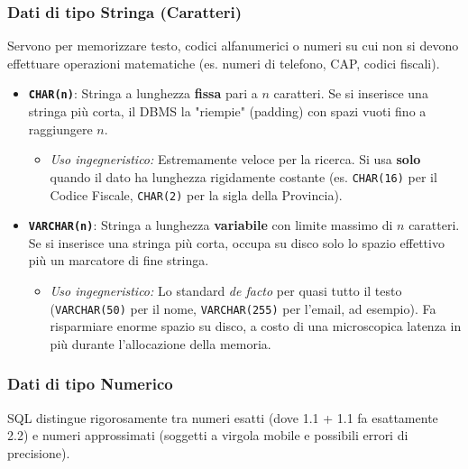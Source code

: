 \subsubsection*{Dati di tipo Stringa (Caratteri)}
Servono per memorizzare testo, codici alfanumerici o numeri su cui non si devono effettuare operazioni matematiche (es. numeri di telefono, CAP, codici fiscali).

\begin{itemize}
    \item \texttt{\textbf{CHAR(n)}}: Stringa a lunghezza \textbf{fissa} pari a $n$ caratteri. Se si inserisce una stringa più corta, il DBMS la "riempie" (padding) con spazi vuoti fino a raggiungere $n$.
    \begin{itemize}
        \item \textit{Uso ingegneristico:} Estremamente veloce per la ricerca. Si usa \textbf{solo} quando il dato ha lunghezza rigidamente costante (es. \texttt{CHAR(16)} per il Codice Fiscale, \texttt{CHAR(2)} per la sigla della Provincia).
    \end{itemize}
    
    \item \texttt{\textbf{VARCHAR(n)}}: Stringa a lunghezza \textbf{variabile} con limite massimo di $n$ caratteri. Se si inserisce una stringa più corta, occupa su disco solo lo spazio effettivo più un marcatore di fine stringa.
    \begin{itemize}
        \item \textit{Uso ingegneristico:} Lo standard \textit{de facto} per quasi tutto il testo (\texttt{VARCHAR(50)} per il nome, \texttt{VARCHAR(255)} per l'email, ad esempio). Fa risparmiare enorme spazio su disco, a costo di una microscopica latenza in più durante l'allocazione della memoria.
    \end{itemize}
\end{itemize}

\subsubsection*{Dati di tipo Numerico}
SQL distingue rigorosamente tra numeri esatti (dove 1.1 + 1.1 fa esattamente 2.2) e numeri approssimati (soggetti a virgola mobile e possibili errori di precisione).

